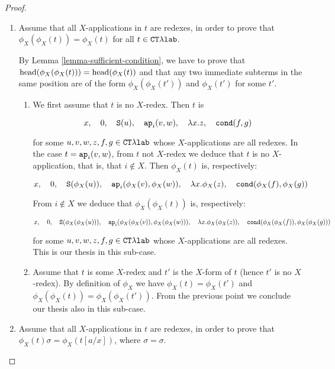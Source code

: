 \begin{proof}
\begin{enumerate}

\item
Assume that  all $X$-applications in $t$ are redexes, 
in order to prove that $\phi_{X}(\phi_{X}(t)) = \phi_{X}(t)$ for all $t \in { { {\tt CT}\lambda} \mbox{\tt lab}}$.

By Lemma \ref{lemma-sufficient-condition}, we have to prove that
${\rm head}(\phi_{X}(\phi_{X}(t))) = {\rm head}(\phi_{X}(t))$ and that any two immediate subterms
in the same position are of the form $\phi_{X}(\phi_{X}(t'))$ and $\phi_{X}(t')$ for some $t'$.

\begin{enumerate}
\item
We first assume that $t$ is no $X$-redex. Then $t$ is

$$ 
x, \ \ \  
0, \ \ \  
{\tt S}(u),  \ \ \  
{\tt ap}_i(v,w), \ \ \  
\lambda x.z, \ \ \  
{\tt cond}(f,g)
$$

for some $u,v,w,z,f,g \in { { {\tt CT}\lambda} \mbox{\tt lab}}$ whose $X$-applications are all redexes.
In the case $t = {\tt ap}_i(v,w)$, from $t$ not $X$-redex we deduce that $t$ is no
$X$-application, that is, that $i \not \in X$.
Then $\phi_X(t)$ is, respectively: 

$$ 
x, \ \ \  
0, \ \ \  
{\tt S}(\phi_X(u)),  \ \ \  
{\tt ap}_i(\phi_X(v),\phi_X(w)), \ \ \  
\lambda x.\phi_X(z), \ \ \  
{\tt cond}(\phi_X(f),\phi_X(g))
$$

From $i \not \in X$ we deduce that $\phi_X(\phi_X(t))$ is, respectively: 

$$ 
x, \ \ \  
0, \ \ \  
{\tt S}( \phi_X(\phi_X(u)) ),  \ \ \  
{\tt ap}_i( \phi_X(\phi_X(v)),\phi_X(\phi_X(w))  ), \ \ \  
\lambda x.\phi_X(\phi_X(z)), \ \ \  
{\tt cond}( \phi_X(\phi_X(f)), \phi_X(\phi_X(g)) )
$$

for some $u,v,w,z,f,g \in { { {\tt CT}\lambda} \mbox{\tt lab}}$ whose $X$-applications are all redexes.
This is our thesis in this sub-case.

\item
Assume that $t$ is some $X$-redex and $t'$ is the $X$-form of $t$ (hence $t'$ is no $X$-redex).
By definition of $\phi_X$ we have $\phi_X(t) =\phi_X(t')$ and $\phi_X(\phi_X(t)) = \phi_X(\phi_X(t'))$.
From the previous point we conclude our thesis also in this sub-case.
\end{enumerate}


\item
Assume that  all $X$-applications in $t$ are redexes, 
in order to prove that $\phi_{X}(t)\sigma= \phi_{X}(t[a/x])$, where $\sigma=\sigma$.



\end{enumerate}
\end{proof}
